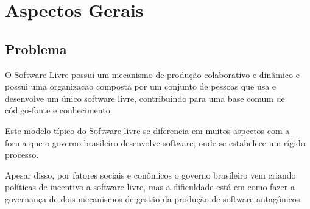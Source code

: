 \part{Aspectos Gerais}

\chapter[Problema]{Problema}

O Software Livre possui um mecanismo de produção colaborativo e dinâmico 
e possui uma organizacao composta por um conjunto de pessoas que usa e desenvolve 
um único software livre, contribuindo para uma base comum de código-fonte e 
conhecimento.\cite{reis2003caracterizacc}

Este modelo típico do Software livre se diferencia em muitos aspectos com a forma
que o governo brasileiro desenvolve software, onde se estabelece um rígido processo.

Apesar disso, por fatores sociais e conômicos o governo brasileiro vem
criando políticas de incentivo a software livre, mas a dificuldade está em como
fazer a governança de dois mecanismos de gestão da produção de software antagônicos. 	


